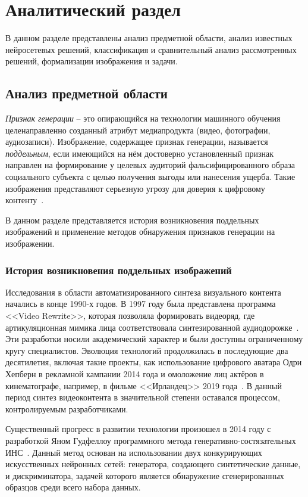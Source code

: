 \chapter{Аналитический раздел}

В данном разделе представлены анализ предметной области, анализ известных нейросетевых решений, классификация и сравнительный анализ рассмотренных решений, формализации изображения и задачи.

\section{Анализ предметной области}

\textit{Признак генерации} -- это опирающийся на технологии машинного обучения целенаправленно созданный атрибут медиапродукта (видео, фотографии, аудиозаписи). Изображение, содержащее признак генерации, называется \textit{поддельным}, если имеющийся на нём достоверно установленный признак направлен на формирование у целевых аудиторий фальсифицированного образа социального субъекта с целью получения выгоды или нанесения ущерба. Такие изображения представляют серьезную угрозу для доверия к цифровому контенту~\cite{spb-uni}.

В данном разделе представляется история возникновения поддельных изображений и применение методов обнаружения признаков генерации на изображении.

\subsection{История возникновения поддельных изображений}

Исследования в области автоматизированного синтеза визуального контента начались в конце 1990-х годов. В 1997 году была представлена программа <<Video Rewrite>>, которая позволяла формировать видеоряд, где артикуляционная мимика лица соответствовала синтезированной аудиодорожке~\cite{video-rewrite}. Эти разработки носили академический характер и были доступны ограниченному кругу специалистов. Эволюция технологий продолжилась в последующие два десятилетия, включая такие проекты, как использование цифрового аватара Одри Хепберн в рекламной кампании 2014 года и омоложение лиц актёров в кинематографе, например, в фильме <<Ирландец>> 2019 года~\cite{audrey-hepburn}\cite{flux}. В данный период синтез видеоконтента в значительной степени оставался процессом, контролируемым разработчиками.

Существенный прогресс в развитии технологии произошел в 2014 году с разработкой Яном Гудфеллоу программного метода генеративно-состязательных ИНС~\cite{gan}. Данный метод основан на использовании двух конкурирующих искусственных нейронных сетей: генератора, создающего синтетические данные, и дискриминатора, задачей которого является обнаружение сгенерированных образцов среди всего набора данных. 

